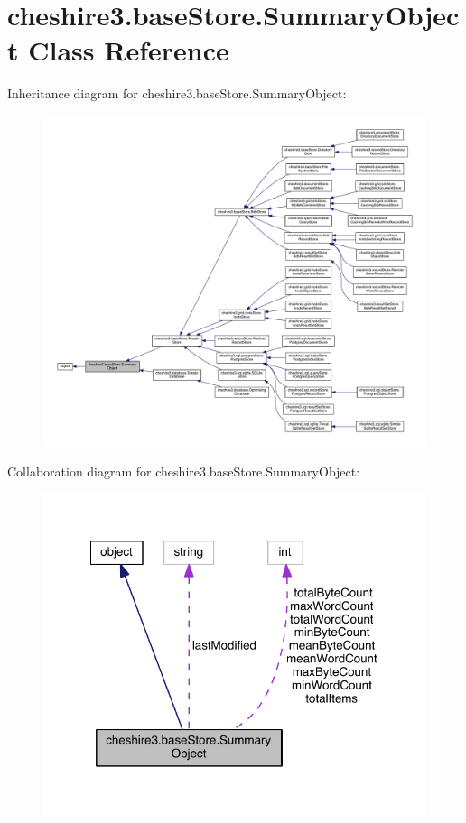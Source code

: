 \hypertarget{classcheshire3_1_1base_store_1_1_summary_object}{\section{cheshire3.\-base\-Store.\-Summary\-Object Class Reference}
\label{classcheshire3_1_1base_store_1_1_summary_object}
}


Inheritance diagram for cheshire3.\-base\-Store.\-Summary\-Object\-:
\nopagebreak
\begin{figure}[H]
\begin{center}
\leavevmode
\includegraphics[width=350pt]{classcheshire3_1_1base_store_1_1_summary_object__inherit__graph}
\end{center}
\end{figure}


Collaboration diagram for cheshire3.\-base\-Store.\-Summary\-Object\-:
\nopagebreak
\begin{figure}[H]
\begin{center}
\leavevmode
\includegraphics[width=318pt]{classcheshire3_1_1base_store_1_1_summary_object__coll__graph}
\end{center}
\end{figure}
